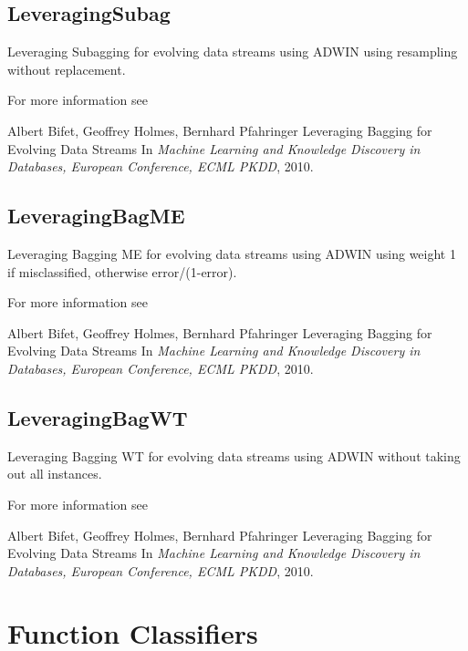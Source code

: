\documentclass[a4paper,12pt,twoside]{book}
\begin{document}
\subsection{LeveragingSubag}
  Leveraging Subagging for evolving data streams using ADWIN
  using resampling without replacement.


For more information see
 
 \begin{itemize}
Albert Bifet, Geoffrey Holmes, Bernhard Pfahringer
\newblock Leveraging Bagging for Evolving Data Streams
\newblock In {\em Machine Learning and Knowledge Discovery in Databases, European
               Conference, ECML PKDD}, 2010.
\end{itemize}

\subsection{LeveragingBagME}
 Leveraging Bagging ME for evolving data streams using ADWIN
  using weight 1 if misclassified, otherwise error/(1-error).

For more information see
 
 \begin{itemize}
Albert Bifet, Geoffrey Holmes, Bernhard Pfahringer
\newblock Leveraging Bagging for Evolving Data Streams
\newblock In {\em Machine Learning and Knowledge Discovery in Databases, European
               Conference, ECML PKDD}, 2010.
\end{itemize}
 
\subsection{LeveragingBagWT}
Leveraging Bagging WT for evolving data streams using ADWIN
 without taking out all instances.

For more information see
 
 \begin{itemize}
Albert Bifet, Geoffrey Holmes, Bernhard Pfahringer
\newblock Leveraging Bagging for Evolving Data Streams
\newblock In {\em Machine Learning and Knowledge Discovery in Databases, European
               Conference, ECML PKDD}, 2010.
\end{itemize}

\ENDOMIT

\section{Function Classifiers}
\end{document}
